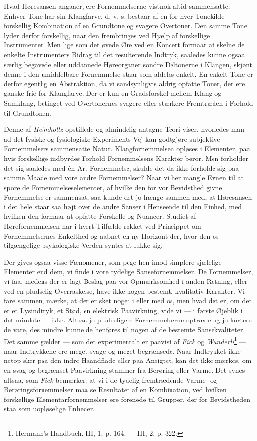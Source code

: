 \documentclass[12pt,a4paper,openany]{book}
\newcommand{\opage}[1]{\marginnote{\footnotesize\textit{[#1]}}}
\begin{document}
Hvad Høresansen angaaer, ere Fornemmelserne vistnok altid sammensatte.
Enhver Tone har sin Klangfarve, d. v. s. bestaar af en for hver
Tonekilde forskellig Kombination af en Grundtone og svagere Overtoner.
Den samme Tone lyder derfor forskellig, naar den frembringes ved Hjælp
af forskellige Instrumenter. Men lige som det øvede Øre ved en Koncert
formaar at skelne de enkelte Instrumenters Bidrag til det resulterende
Indtryk, saaledes kunne ogsaa særlig begavede eller uddannede
Høreorganer sondre Deltonerne i Klangen, skjønt denne i den umiddelbare
Fornemmelse staar som aldeles enkelt. En enkelt Tone er derfor egentlig
en Abstraktion, da vi sandsynligvis aldrig opfatte Toner, der ere ganske
frie for Klangfarve. Der er kun en Gradsforskel mellem Klang og
Samklang, betinget ved Overtonernes svagere eller stærkere Fremtræden i
Forhold til Grundtonen.

Denne af \emph{Helmholtz} opstillede og almindelig antagne Teori viser,
hvorledes man ad det fysiske og fysiologiske Experiments Vej kan
godtgjøre subjektive Fornemmelsers sammensatte Natur. Klangfornemmelsen
opløses i Elementer, paa hvis forskellige indbyrdes Forhold
Fornemmelsens Karakter beror. Men forholder det sig saaledes med én Art
Fornemmelse, skulde det da ikke forholde sig paa samme Maade med vore
andre Fornemmelser? Naar vi her mangle Evnen til at spore de
Fornemmelseselementer, af hvilke den for vor Bevidsthed givne
Fornemmelse er sammensat, saa kunde det jo hænge sammen med, at
Høresansen i det hele staar saa højt over de andre Sanser i Henseende
til den Finhed, med hvilken den formaar at opfatte Forskelle og Nuancer.
Studiet af Hørefornemmelsen har i hvert Tilfælde rokket ved Princippet
om Fornemmelsernes Enkelthed og aabnet en ny Horizont der, hvor den os
tilgængelige psykologiske Verden syntes at lukke sig.

Der gives ogsaa visse Fænomener, som pege hen imod simplere sjælelige
Elementer end dem, vi finde i vore tydelige Sansefornemmelser. De
Fornemmelser, vi faa, medens der er
\opage{126}lagt Beslag paa vor Opmærksomhed i anden Retning, eller ved
en pludselig Overraskelse, have ikke nogen bestemt, kvalitativ Karakter.
Vi fare sammen, mærke, at der er sket noget i eller med os, men hvad det
er, om det er et Lysindtryk, et Stød, en elektrisk Paavirkning, vide vi
--- i første Øjeblik i det mindste --- ikke. Altsaa jo pludseligere
Fornemmelserne optræde og jo kortere de vare, des mindre kunne de
henføres til nogen af de bestemte Sansekvaliteter. Det samme gælder ---
som det experimentalt er paavist af \emph{Fick} og
\emph{Wunderli}\footnote[1]{Hermann’s Handbuch. III, 1. p. 164. --- III,
2. p. 322.} --- naar Indtrykkene ere meget svage og meget begrænsede.
Naar Indtrykket ikke netop sker paa den indre Haandflade eller paa
Ansigtet, kan det ikke mærkes, om en svag og begrænset Paavirkning
stammer fra Berøring eller Varme. Det synes altsaa, som \emph{Fick}
bemærker, at vi i de tydelig fremtrædende Varme- og
Berøringsfornemmelser maa se Resultater af en Kombination, ved hvilken
forskellige Elementarfornemmelser ere forenede til Grupper, der for
Bevidstheden staa som uopløselige Enheder.
\end{document}
